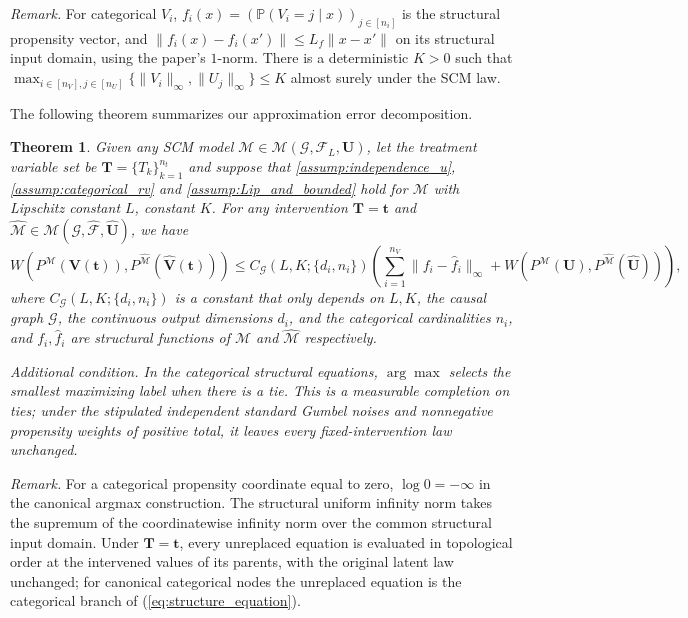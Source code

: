 \documentclass[12pt]{article}
\theoremstyle{plain}
\newtheorem{theorem}{Theorem}[section]
\theoremstyle{definition}
\theoremstyle{remark}
\begin{document}
\noindent\textit{Remark.} For categorical $V_i$, $f_i(x)=(\mathbb{P}(V_i=j\mid x))_{j\in[n_i]}$ is the structural propensity vector, and $\|f_i(x)-f_i(x')\|\leqslant L_f\|x-x'\|$ on its structural input domain, using the paper's $1$-norm. There is a deterministic $K>0$ such that $\max_{i\in[n_V],j\in[n_U]}\{\|V_i\|_\infty,\|U_j\|_\infty\}\leqslant K$ almost surely under the SCM law.

The following theorem summarizes our approximation error decomposition.
\begin{theorem}\label{thm:approximation}
  Given any SCM model $ \mathcal{M} \in \mathcal{M}(\mathcal{G} ,\mathcal{F}_L ,\boldsymbol{U})$, let the treatment variable set be $ \boldsymbol{T} =\{T_k\}_{k=1}^{n_t}$ and suppose that  \cref{assump:independence_u}, \ref{assump:categorical_rv} and \ref{assump:Lip_and_bounded} hold for $\mathcal{M}$ with Lipschitz constant $L$, constant $K$. For any intervention $\boldsymbol T=\boldsymbol t$ and $\hat{\mathcal M}\in\mathcal M(\mathcal G,\hat{\mathcal F},\hat{\boldsymbol U})$, we have
\begin{equation*}
W\left(P^{\mathcal M}(\boldsymbol V(\boldsymbol t)),P^{\hat{\mathcal M}}(\hat{\boldsymbol V}(\boldsymbol t))\right)
\leqslant C_{\mathcal G}(L,K;\{d_i,n_i\})\left(\sum_{i=1}^{n_V}\|f_i-\hat f_i\|_\infty+W\left(P^{\mathcal M}(\boldsymbol U),P^{\hat{\mathcal M}}(\hat{\boldsymbol U})\right)\right),
\end{equation*}
where $C_{\mathcal G}(L,K;\{d_i,n_i\})$ is a constant that only depends on $L,K$, the causal graph $\mathcal G$, the continuous output dimensions $d_i$, and the categorical cardinalities $n_i$, and $f_i,\hat f_i$ are structural functions of $\mathcal M$ and $\hat{\mathcal M}$ respectively.

\emph{Additional condition.} In the categorical structural equations, $\arg\max$ selects the smallest maximizing label when there is a tie. This is a measurable completion on ties; under the stipulated independent standard Gumbel noises and nonnegative propensity weights of positive total, it leaves every fixed-intervention law unchanged.
\end{theorem}

\noindent\textit{Remark.} For a categorical propensity coordinate equal to zero, $\log0=-\infty$ in the canonical argmax construction. The structural uniform infinity norm takes the supremum of the coordinatewise infinity norm over the common structural input domain. Under $\boldsymbol{T}=\boldsymbol{t}$, every unreplaced equation is evaluated in topological order at the intervened values of its parents, with the original latent law unchanged; for canonical categorical nodes the unreplaced equation is the categorical branch of (\ref{eq:structure_equation}).
\end{document}
